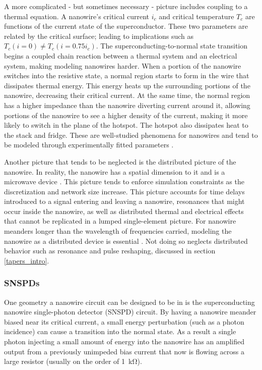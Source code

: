 A more complicated - but sometimes necessary - picture includes coupling to a thermal equation.
A nanowire's critical current $i_c$ and critical temperature $T_c$ are
functions of the current state of the superconductor. These two parameters are related by the critical
surface; leading to implications such as $T_c(i=0) \neq T_c(i=0.75i_c)$. 
The superconducting-to-normal state transition
begins a coupled chain reaction between a thermal system and an electrical system, making
modeling nanowires harder. When a portion of the nanowire switches into the resistive 
state, a normal region starts to form in the wire that dissipates thermal energy. This
energy heats up the surrounding portions of the nanowire, decreasing their critical 
current. At the same time, the normal region has a higher impedance than the nanowire
diverting current around it, allowing portions of the nanowire to see a higher density of
the current, making it more likely to switch in the plane of the hotspot. The hotspot also
dissipates heat to the stack and fridge. These are well-studied phenomena for nanowires
and tend to be modeled through experimentally fitted parameters \cite{phen_model, karl_spice}. 

Another picture that tends to be neglected is the distributed picture of the nanowire.
In reality, the nanowire has a spatial dimension to it and is a microwave device
\cite{distributed_nanowire_model, santavicca_microwave}. This
picture tends to enforce simulation constraints as the discretization and network size
increase. This picture accounts for time delays introduced to a signal entering and
leaving a nanowire, resonances that might occur inside the nanowire, as well as distributed
thermal and electrical effects that cannot be replicated 
in a lumped single-element picture. For nanowire meanders
longer than the wavelength of frequencies carried, modeling the nanowire as a distributed device
is essential \cite{distributed_nanowire_model}. Not doing so neglects distributed behavior such as resonance and pulse reshaping, discussed in section \ref{tapers_intro}.



\subsubsection{SNSPDs}

One geometry a nanowire circuit can be designed to be in is the superconducting nanowire 
single-photon detector (SNSPD) circuit. By having a nanowire meander biased near
its critical current, a small energy perturbation (such as a photon incidence)
can cause a transition into the normal state. As a result a single photon injecting
a small amount of energy into the nanowire has an amplified output from a previously
unimpeded bias 
current that now is flowing across a large resistor (usually on the order of 
\qty{1}{\kilo\ohm}).

